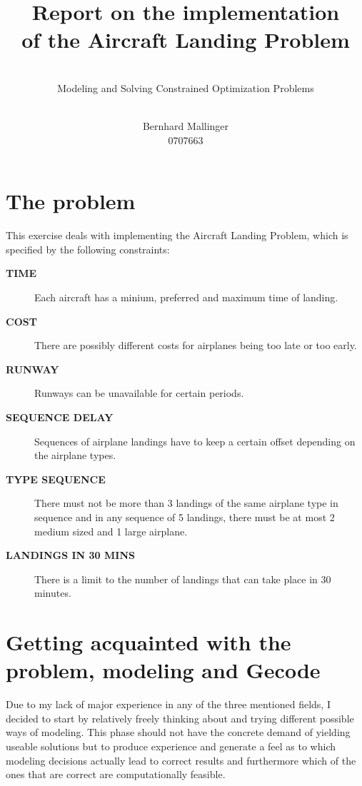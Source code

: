 \documentclass[,%
			paper=a4,%
			DIV12,
			liststotoc,
			bibtotoc,
			draft=false,%
			numbers=noendperiod
			]{scrartcl}
\title{Report on the implementation\\of the Aircraft Landing Problem}
\subtitle{\hfill \\ Modeling and Solving Constrained Optimization Problems}
\author{\hfill \\ Bernhard Mallinger \\ 0707663}
\begin{document}
\maketitle

\section{The problem}

This exercise deals with implementing the Aircraft Landing Problem, which is specified by the following constraints:

\newcommand{\constr}[1]{\textbf{\textsf{#1}}}
\newcommand{\Ctime}{\constr{TIME}}
\newcommand{\Ccost}{\constr{COST}}
\newcommand{\Crunway}{\constr{RUNWAY}}
\newcommand{\CseqDel}{\constr{SEQUENCE DELAY}}
\newcommand{\CtypeSeq}{\constr{TYPE SEQUENCE}}
\newcommand{\Clandings}{\constr{LANDINGS IN 30 MINS}}
\begin{description}
	\item[\Ctime] Each aircraft has a minium, preferred and maximum time of landing.
	\item[\Ccost] There are possibly different costs for airplanes being too late or too early.
	\item[\Crunway] Runways can be unavailable for certain periods.
	\item[\CseqDel] Sequences of airplane landings have to keep a certain offset depending on the airplane types.
	\item[\CtypeSeq] There must not be more than 3 landings of the same airplane type in sequence and in any sequence of 5 landings, there must be at most 2 medium sized and 1 large airplane.
	\item[\Clandings] There is a limit to the number of landings that can take place in 30 minutes.

\end{description}

\section{Getting acquainted with the problem, modeling and Gecode}

Due to my lack of major experience in any of the three mentioned fields, I decided to start by relatively freely thinking about and trying different possible ways of modeling.
This phase should not have the concrete demand of yielding useable solutions but to produce experience and generate a feel as to which modeling decisions actually lead to correct results and furthermore which of the ones that are correct are computationally feasible.
\end{document}
